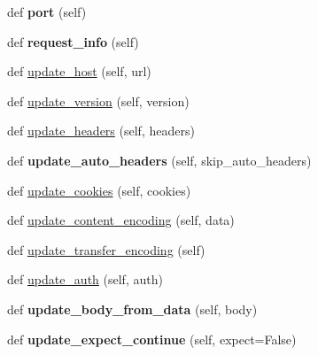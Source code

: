 \begin{DoxyCompactItemize}
def {\bfseries port} (self)
\item 
\mbox{\label{classaiohttp_1_1client__reqrep_1_1_client_request_a7df3b07c4fc144326445868f23958d82}} 
def {\bfseries request\+\_\+info} (self)
\item 
def \hyperlink{classaiohttp_1_1client__reqrep_1_1_client_request_a20af8f13a56908ed296eabcc7a8239be}{update\+\_\+host} (self, url)
\item 
def \hyperlink{classaiohttp_1_1client__reqrep_1_1_client_request_a2468c62a8de0cbdec88459a18e1684ff}{update\+\_\+version} (self, version)
\item 
def \hyperlink{classaiohttp_1_1client__reqrep_1_1_client_request_a84481e785d650e103a60f8b3c78eb850}{update\+\_\+headers} (self, headers)
\item 
\mbox{\label{classaiohttp_1_1client__reqrep_1_1_client_request_a2161c212e523184997ac413acbae4f0a}} 
def {\bfseries update\+\_\+auto\+\_\+headers} (self, skip\+\_\+auto\+\_\+headers)
\item 
def \hyperlink{classaiohttp_1_1client__reqrep_1_1_client_request_abe6f36644643ea64606d559d0e3c2cb1}{update\+\_\+cookies} (self, cookies)
\item 
def \hyperlink{classaiohttp_1_1client__reqrep_1_1_client_request_a96f9a27c169c3d710dc83eb5161e79f2}{update\+\_\+content\+\_\+encoding} (self, data)
\item 
def \hyperlink{classaiohttp_1_1client__reqrep_1_1_client_request_a7ba982e9990f4006714a2596b774dd85}{update\+\_\+transfer\+\_\+encoding} (self)
\item 
def \hyperlink{classaiohttp_1_1client__reqrep_1_1_client_request_a9be160b7c3f43bdb8b2ffe832c9bb7a1}{update\+\_\+auth} (self, auth)
\item 
\mbox{\label{classaiohttp_1_1client__reqrep_1_1_client_request_ada8d1fc25b1eb10f09a364b7c48e4d41}} 
def {\bfseries update\+\_\+body\+\_\+from\+\_\+data} (self, body)
\item 
\mbox{\label{classaiohttp_1_1client__reqrep_1_1_client_request_a7155cdd326a9aaba0c5431a6d868281f}} 
def {\bfseries update\+\_\+expect\+\_\+continue} (self, expect=False)
\item 

\end{DoxyCompactItemize}
